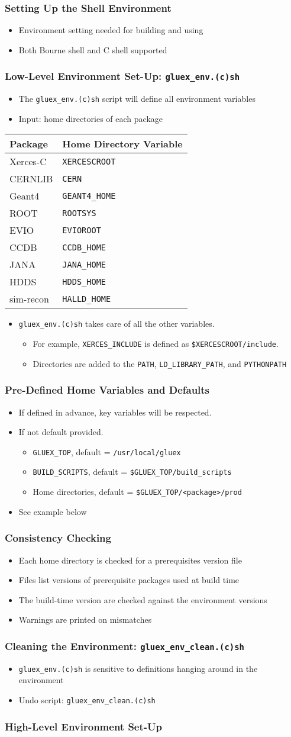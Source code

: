 \documentclass{beamer}
\newcommand{\bi}{\begin{itemize}}
\newcommand{\ei}{\end{itemize}}
\newcommand{\I}{\item}
\begin{document}
\begin{frame}\frametitle{Setting Up the Shell Environment}
\bi
\I Environment setting needed for building and using
\I Both Bourne shell and C shell supported
\ei
\end{frame}\begin{frame}\frametitle{Low-Level Environment Set-Up: {\tt gluex\_env.(c)sh}}
\bi
\I The {\tt gluex\_env.(c)sh} script will define all environment variables
\I Input: home directories of each package
\ei

\begin{center}
\begin{tabular}{|l|l|}
\hline
\bf Package & \bf Home Directory Variable \\
\hline Xerces-C & {\tt XERCESCROOT} \\
CERNLIB & {\tt CERN} \\
Geant4 & {\tt GEANT4\_HOME} \\
ROOT & {\tt ROOTSYS} \\
EVIO & {\tt EVIOROOT} \\
CCDB & {\tt CCDB\_HOME} \\
JANA & {\tt JANA\_HOME} \\
HDDS & {\tt HDDS\_HOME} \\
sim-recon & {\tt HALLD\_HOME} \\
\hline
\end{tabular}
\end{center}

\bi
\I {\tt gluex\_env.(c)sh} takes care of all the other variables.
  \bi
  \I For example, {\tt XERCES\_INCLUDE} is defined as {\tt \$XERCESCROOT/include}.
  \I Directories are added to the {\tt PATH}, {\tt LD\_LIBRARY\_PATH}, and {\tt PYTHONPATH}
  \ei
\ei
\end{frame}
\begin{frame}\frametitle{Pre-Defined Home Variables and Defaults}
\bi
\I If defined in advance, key variables will be respected.
\I If not default provided.
  \bi
  \I {\tt GLUEX\_TOP}, default =  {\tt /usr/local/gluex}
  \I {\tt BUILD\_SCRIPTS}, default = {\tt \$GLUEX\_TOP/build\_scripts}
  \I Home directories, default = {\tt \$GLUEX\_TOP/<package>/prod}
  \ei
\I See example below
\ei
\end{frame}\begin{frame}\frametitle{Consistency Checking}
\bi
\I Each home directory is checked for a prerequisites version file
\I Files list versions of prerequisite packages used at build time
\I The build-time version are checked against the environment versions
\I Warnings are printed on mismatches
\ei
\end{frame}\begin{frame}\frametitle{Cleaning the Environment: {\tt gluex\_env\_clean.(c)sh}}
\bi
\I {\tt gluex\_env.(c)sh} is sensitive to definitions hanging
around in the environment
\I Undo script: {\tt gluex\_env\_clean.(c)sh}
\ei
\end{frame}\begin{frame}\frametitle{High-Level Environment Set-Up}

\end{frame}
\end{document}
